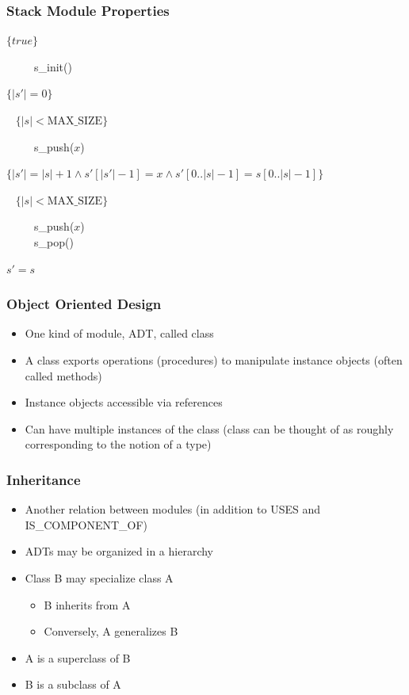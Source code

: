 \documentclass[t,12pt,numbers,fleqn]{beamer}
\begin{document}
\begin{frame}
\frametitle{Stack Module Properties}

$\{ \mathit{true} \}$

~~~~~s\_init()

$\{ | s' | = 0 \}$

~\newline
$\{ | s | < \mbox{MAX\_SIZE} \}$

~~~~~s\_push($x$)

$\{ | s' | = | s | + 1 \wedge s'[|s'| - 1] = x \wedge s'[0..|s|-1] = s[0..|s|-1] \}$

~\newline
$\{ |s| < \mbox{MAX\_SIZE} \}$

~~~~~s\_push($x$)\\
~~~~~s\_pop()

$s' = s$

\end{frame}


\begin{frame}
\frametitle{Object Oriented Design}
\begin{itemize}
\item One kind of module, ADT, called class
\item A class exports operations (procedures) to manipulate instance objects (often called methods)
\item Instance objects accessible via references
\item Can have multiple instances of the class (class can be thought of as roughly corresponding to the notion of a type)
\end{itemize}
\end{frame}


\begin{frame}
\frametitle{Inheritance}
\begin{itemize}
\item Another relation between modules (in addition to USES and IS\_COMPONENT\_OF)
\item ADTs may be organized in a hierarchy
\item Class B may specialize class A
\begin{itemize}
\item B inherits from A
\item Conversely, A generalizes B
\end{itemize}
\item A is a superclass of B
\item B is a subclass of A
\end{itemize}
\end{frame}
\end{document}

